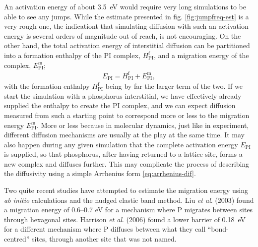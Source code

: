\documentclass[11pt,bibliography=totoc,index=totoc]{scrbook}   %
\begin{document}
An activation energy of about 3.5~eV would require very long simulations to be able to see any jumps.
While the estimate presented in fig. \ref{fig:jumpfreq-est} is a very rough one, 
the indicationt that simulating diffusion with such an activation energy is several orders of magnitude out of reach, 
is not encouraging.
On the other hand, the total activation energy of interstitial diffusion can be partitioned into 
a formation enthalpy of the PI complex, $H_{\text{PI}}^{\text{f}}$, and a migration energy of 
the complex, $E_{\text{PI}}^{\text{m}}$;\cite[323]{Fahey:1989}
\begin{align}
    E_{\text{PI}} = H_{\text{PI}}^{\text{f}} + E_{\text{PI}}^{\text{m}},
\end{align}
with the formation enthalpy $H_{\text{PI}}^{\text{f}}$ being by far the larger term of the two.
If we start the simulation with a phosphorus interstitial, 
we have effectively already supplied the enthalpy to create the PI complex, 
and we can expect diffusion measured from such a starting point to correspond more or less to the migration energy $E_{\text{PI}}^{\text{m}}$.
More or less because in molecular dynamics, just like in experiment, different diffusion mechanisms are usually at the play at the same time.
It may also happen during any given simulation that the complete activation energy $E_{\text{PI}}$ is supplied, 
so that phosphorus, after having returned to a lattice site, forms a new complex and diffuses further.
This may complicate the process of describing the diffusivity using a simple Arrhenius form \eqref{eq:arrhenius-dif}.

Two quite recent studies have attempted to estimate the migration energy using \textit{ab initio} calculations and the nudged elastic band method.
Liu \textit{et al}. (2003) found a migration energy of 0.6--0.7 eV for a mechanism where P migrates between  sites through hexagonal sites.\cite{Liu:2003}
Harrison \textit{et al}. (2006) found a lower barrier of 0.18~eV for a different mechanism where P diffuses between what they call ``bond-centred'' sites, 
through another site that was not named.\cite{Harrison:2006}


\end{document}
